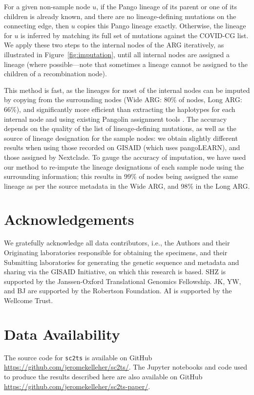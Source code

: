 \documentclass{article}
\begin{document}
For a given non-sample node $u$, if the Pango lineage of its parent or
one of its children is already known, and there are no lineage-defining mutations
on the connecting edge, then $u$ copies this Pango lineage exactly.
Otherwise, the lineage for $u$ is inferred by
matching its full set of mutations against the COVID-CG list.
We apply these two steps to the internal nodes of the ARG iteratively,
as illustrated in Figure~\ref{fig:imputation}, until all internal nodes
are assigned a lineage (where possible---note that sometimes a lineage cannot
be assigned to the children of a recombination node).

This method is fast, as the lineages for most of the internal nodes can be
imputed by copying from the surrounding nodes
(Wide ARG: 80\% of nodes,
Long ARG: 66\%),
and significantly more efficient than extracting
the haplotypes for each internal node and using existing Pangolin assignment tools
\citep{OToole2021-assignment}. The
accuracy depends on the quality of the list of lineage-defining mutations,
as well as the source of lineage designation for the sample nodes: we obtain
slightly different results when using those recorded on GISAID (which uses
pangoLEARN), and those assigned by Nextclade. To gauge the accuracy of
imputation, we have used our method to re-impute the lineage designations of each
sample node using the surrounding information; this results in
99\% of nodes being assigned the same lineage as per the source metadata in the
Wide ARG, and 98\% in the Long ARG.

\section{Acknowledgements}
We gratefully acknowledge all data contributors, i.e., the Authors and their
Originating laboratories responsible for obtaining the specimens, and their
Submitting laboratories for generating the genetic sequence and metadata and
sharing via the GISAID Initiative, on which this research is based.
SHZ is supported by the Janssen-Oxford Translational Genomics Fellowship. JK,
YW, and BJ are supported by the Robertson Foundation. AI is supported by the Wellcome Trust.

\section{Data Availability}
The source code for \texttt{sc2ts} is
available on GitHub
\url{https://github.com/jeromekelleher/sc2ts/}.
The Jupyter notebooks and code used to produce the results described here are also
available on GitHub \url{https://github.com/jeromekelleher/sc2ts-paper/}.
\end{document}
